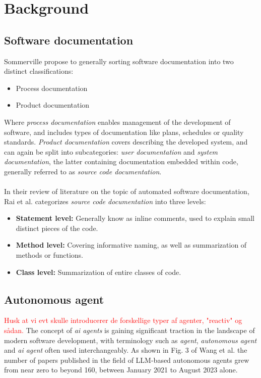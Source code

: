 \section{Background}

\subsection{Software documentation}
Sommerville \cite{sommerville2001software} propose to generally sorting software documentation into two distinct classifications:
\begin{itemize}
    \item Process documentation
    \item Product documentation
\end{itemize}
Where \textit{process documentation} enables management of the development of software, and includes types of documentation like plans, schedules or quality standards. \textit{Product documentation} covers describing the developed system, and can again be split into subcategories: \textit{user documentation} and \textit{system documentation}, the latter containing documentation embedded within code, generally referred to as \textit{source code documentation}.
\\\\
In their review of literature on the topic of automated software documentation, Rai et al. \cite{rai2022review} categorizes \textit{source code documentation} into three levels:
\begin{itemize}
    \item \textbf{Statement level:} Generally know as inline comments, used to explain small distinct pieces of the code.
    \item \textbf{Method level:} Covering informative naming, as well as summarization of methods or functions.
    \item \textbf{Class level:} Summarization of entire classes of code.
\end{itemize}

\subsection{Autonomous agent}
\textcolor{red}{Husk at vi evt skulle introducerer de forskellige typer af agenter, "reactiv" og sådan.}
\label{sec:Autonomous agent}
The concept of \textit{ai agents} is gaining significant traction in the landscape of modern software development, with terminology such as \textit{agent}, \textit{autonomous agent} and \textit{ai agent} often used interchangeably. As shown in Fig. 3 of Wang et al.\cite{wang2024survey} the number of papers published in the field of LLM-based autonomous agents grew from near zero to beyond 160, between January 2021 to August 2023 alone.

